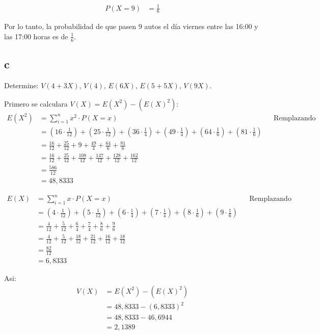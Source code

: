 \documentclass{templateNote}
\begin{document}
\begin{align*}
    P(X=9) &= \frac{1}{6}
\end{align*}

Por lo tanto, la probabilidad de que pasen 9 autos el día viernes entre las 16:00 y las 17:00 horas es de $\frac{1}{6}$.

\subsection{c}
Determine: $V(4+3X)$, $V(4)$, $E(6X)$, $E(5+5X)$, $V(9X)$.

Primero se calculara $V(X) = E(X^2) - (E(X)^2)$:
\begin{align*}
    E(X^2) &= \sum_{i=1}^{n}{x^2 \cdot P(X=x)} && \text{Remplazando} \\
    &= (16 \cdot \frac{1}{12}) + (25 \cdot \frac{1}{12}) + (36 \cdot \frac{1}{4}) + (49 \cdot \frac{1}{4}) + (64 \cdot \frac{1}{6}) + (81 \cdot \frac{1}{6}) \\
    &= \frac{16}{12} + \frac{25}{12} + 9 + \frac{49}{4} + \frac{64}{6} + \frac{81}{6} \\
    &= \frac{16}{12} + \frac{25}{12} + \frac{108}{12} + \frac{147}{12} + \frac{128}{12} + \frac{162}{12} \\
    &= \frac{586}{12} \\
    &= 48,8333
\end{align*}

\begin{align*}
    E(X) &= \sum_{i=1}^{n}{x \cdot P(X=x)} && \text{Remplazando} \\
    &= (4 \cdot \frac{1}{12}) + (5 \cdot \frac{1}{12}) + (6 \cdot \frac{1}{4}) + (7 \cdot \frac{1}{4}) + (8 \cdot \frac{1}{6}) + (9 \cdot \frac{1}{6}) \\
    &= \frac{4}{12} + \frac{5}{12} + \frac{6}{4} + \frac{7}{4} + \frac{8}{6} + \frac{9}{6} \\
    &= \frac{4}{12} + \frac{5}{12} + \frac{18}{12} + \frac{21}{12} + \frac{16}{12} + \frac{18}{12} \\
    &= \frac{82}{12} \\
    &= 6,8333
\end{align*}

Asi:
\begin{align*}
    V(X) &= E(X^2) - (E(X)^2) \\
    &= 48,8333 - (6,8333)^2 \\
    &= 48,8333 - 46,6944 \\
    &= 2,1389
\end{align*}
\end{document}
